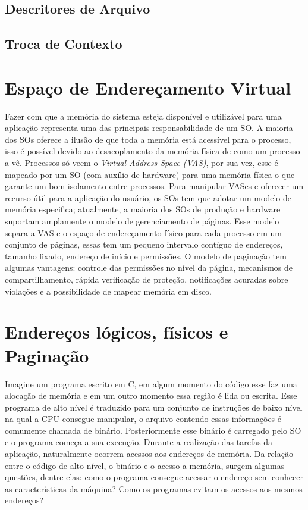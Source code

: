 \subsection{Descritores de Arquivo}

\subsection{Troca de Contexto}

\section{Espaço de Endereçamento Virtual}
Fazer com que a memória do sistema esteja disponível e utilizável para uma
aplicação representa uma das principais responsabilidade de um SO. A maioria
dos SOs oferece a ilusão de que toda a memória está acessível para o processo,
isso é possível devido ao desacoplamento da memória física de como um processo
a vê. Processos só veem o \emph{Virtual Address Space (VAS)}, por sua vez, esse
é mapeado por um SO (com auxílio de hardware) para uma memória física o que
garante um bom isolamento entre processos. Para manipular VASes e oferecer um
recurso útil para a aplicação do usuário, os SOs tem que adotar um modelo de
memória especifica; atualmente, a maioria dos SOs de produção e hardware
suportam amplamente o modelo de gerenciamento de páginas.  Esse modelo separa a
VAS e o espaço de endereçamento físico para cada processo em um conjunto de
páginas, essas tem um pequeno intervalo contíguo de endereços, tamanho fixado,
endereço de início e permissões. O modelo de paginação tem algumas vantagens:
controle das permissões no nível da página, mecanismos de compartilhamento,
rápida verificação de proteção, notificações acuradas sobre violações e a
possibilidade de mapear memória em disco.

\section{Endereços lógicos, físicos e Paginação}

Imagine um programa escrito em C, em algum momento do código esse faz uma
alocação de memória e em um outro momento essa região é lida ou escrita. Esse
programa de alto nível é traduzido para um conjunto de instruções de baixo
nível na qual a CPU consegue manipular, o arquivo contendo essas informações é
comumente chamada de binário.  Posteriormente esse binário é carregado pelo SO
e o programa começa a sua execução. Durante a realização das tarefas da
aplicação, naturalmente ocorrem acessos aos endereços de memória. Da relação
entre o código de alto nível, o binário e o acesso a memória, surgem algumas
questões, dentre elas: como o programa consegue acessar o endereço sem conhecer
as características da máquina? Como os programas evitam os acessos aos mesmos
endereços?

